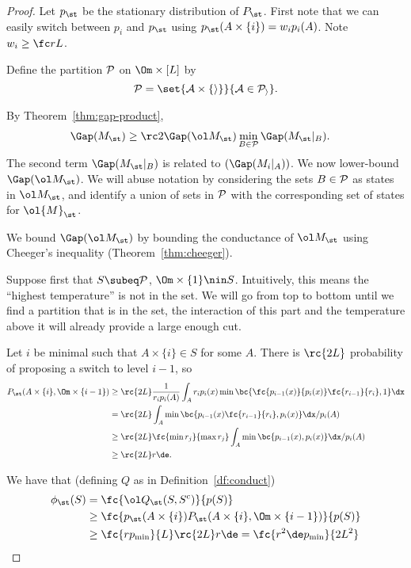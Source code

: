 \begin{proof}
Let $p_{\st}$ be the stationary distribution of $P_{\st}$.
First note that we can easily switch between $p_i$ and $p_{\st}$ using $p_{\st}(A\times \{i\}) = w_i p_i(A)$.  Note $w_i\ge \fc rL$. %

Define the partition $\cal P$ on $\Om\times [L]$ by 
$$
\cal P = \set{A\times \{i\}}{A\in \cal P_i}.
$$

By Theorem~\ref{thm:gap-product},
\begin{align}\label{eq:st-gap-prod0}
\Gap(M_{\st}) & \ge \rc2 \Gap(\ol M_{\st}) 
\min_{B\in \cal P}\Gap(M_{\st}|_B).
\end{align}
The second term $\Gap(M_{\st}|_B)$ is related to $(\Gap(M_{i}|_A))$. We now lower-bound $\Gap(\ol M_{\st}) $. We will abuse notation by considering the sets $B\in \cal P$ as states in $\ol M_{\st}$, and identify a union of sets in $\cal P$ with the corresponding set of states for $\ol{M}_{\st}$. 

We bound $\Gap(\ol M_{\st})$ by bounding the conductance of $\ol M_{\st}$ using Cheeger's inequality (Theorem~\ref{thm:cheeger}). 

Suppose first that $S\subeq \cal P$, $\Om\times \{1\}\nin S$. Intuitively, this means the ``highest temperature'' is not in the set. We will go from top to bottom until we find a partition that is in the set, the interaction of this part and the temperature above it will already provide a large enough cut.

Let $i$ be minimal such that $A\times \{i\}\in S$ for some $A$. There is %
$\rc{2L}$ 
probability of proposing a switch to level $i-1$, so 
\begin{align}
P_{\st}(A\times \{i\}, \Om\times \{i-1\})
&\ge %
\rc{2L} \frac{1}{r_ip_i(A)}
 \int_A r_ip_i(x) \min\bc{
\fc{p_{i-1}(x)}{p_i(x)}\fc{r_{i-1}}{r_i}, 1
}\dx\\
&=%
\rc{2L}\int_A  \min\bc{p_{i-1}(x)\fc{r_{i-1}}{r_i}, p_i(x)}\dx/p_i(A)\\
&\ge%
\rc{2L} \fc{\min r_j}{\max r_j} \int_A \min\bc{p_{i-1}(x), p_i(x)} \dx /  p_i(A)\\
&\ge %
\rc{2L} r\de.
\label{eq:path-bd2-0}
\end{align}

We have that (defining $Q$ as in Definition~\ref{df:conduct})
\begin{align}
\phi_{\st}(S) & =  \fc{\ol Q_{\st}(S,S^c)}{p(S)}\\
&\ge \fc{p_{\st}(A\times \{i\}) P_{\st}(A\times \{i\}, \Om\times \{i-1\})}{p(S)}\\
&\ge \fc{rp_{\min}}{L}  %
\rc{2L}
 r\de
=\fc{r^2\de p_{\min}}{2L^2}
\end{align}


\end{proof}
